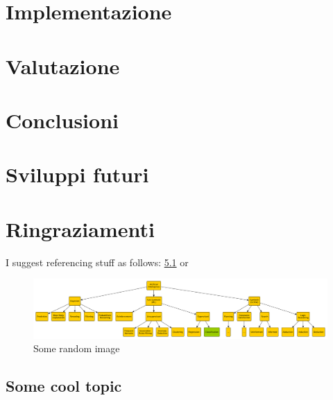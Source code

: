 \documentclass[12pt,a4paper,openright,twoside]{book}
\begin{document}

\chapter{Implementazione}

\chapter{Valutazione}

\chapter{Conclusioni}

\chapter{Sviluppi futuri}

\chapter{Ringraziamenti}

I suggest referencing stuff as follows: \cref{fig:random-image} or 

\begin{figure}
    \centering
    \includegraphics[width=0.8\linewidth]{figures/random-image.pdf}
    \caption{Some random image}
    \label{fig:random-image}
\end{figure}

\section{Some cool topic}
\end{document}
